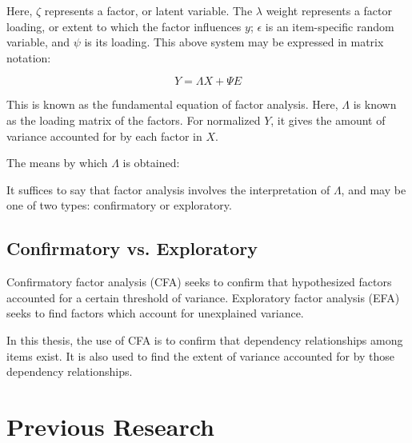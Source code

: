 Here, $\zeta$ represents a factor, or latent variable. The $\lambda$ weight
represents a factor loading, or extent to which the factor influences $y$;
$\epsilon$ is an item-specific random variable, and $\psi$ is its loading. This
above system may be expressed in matrix notation:

\begin{equation}
 \label{eq:factmatrix}
 {Y} = {\Lambda} {X} + {\Psi} {E}
\end{equation}

This is known as the fundamental equation of factor analysis. Here, ${\Lambda}$
is known as the loading matrix of the factors.  For normalized ${Y}$, it gives
the amount of variance accounted for by each factor in ${X}$.  

The means by which ${\Lambda}$ is obtained:


It suffices to say that factor analysis involves the interpretation of
${\Lambda}$, and may be one of two types: confirmatory or exploratory.


\subsection{Confirmatory vs. Exploratory}

Confirmatory factor analysis (CFA) seeks to confirm that hypothesized factors
accounted for a certain threshold of variance. Exploratory factor analysis
(EFA) seeks to find factors which account for unexplained variance.

In this thesis, the use of CFA is to confirm that dependency relationships
among items exist.  It is also used to find the extent of variance accounted
for by those dependency relationships.

\section{Previous Research}

